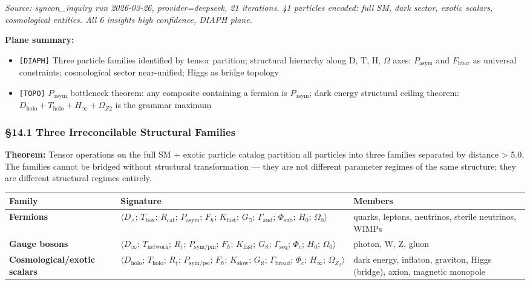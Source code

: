 \documentclass[12pt,a4paper]{article}
\newcommand{\pilcrow}{\S}
\begin{document}
\emph{Source: syncon\_inquiry run 2026-03-26, provider=deepseek, 21 iterations. 41 particles encoded: full SM, dark sector, exotic scalars, cosmological entities. All 6 insights high confidence, DIAPH plane.}

\textbf{Plane summary:}

\begin{itemize}
    \item \texttt{{[}DIAPH{]}} Three particle families identified by tensor partition; structural hierarchy along D, T, H, $\Omega$ axes; $P_{\text{asym}}$ and $F_{\text{hbar}}$ as universal constraints; cosmological sector near-unified; Higgs as bridge topology
    \item \texttt{{[}TOPO{]}} $P_{\text{asym}}$ bottleneck theorem: any composite containing a fermion is $P_{\text{asym}}$; dark energy structural ceiling theorem: $D_{\text{holo}} + T_{\text{holo}} + H_{\infty} + \Omega_{Z2}$ is the grammar maximum
\end{itemize}

\subsubsection{\pilcrow{}14.1 Three Irreconcilable Structural Families}

\textbf{Theorem:} Tensor operations on the full SM + exotic particle catalog partition all particles into three families separated by distance \textgreater{} 5.0. The families cannot be bridged without structural transformation --- they are not different parameter regimes of the same structure; they are different structural regimes entirely.

\begin{table}[htbp]
\centering
\small
{}
\begin{tabularx}{\textwidth}{>{\centering\arraybackslash}X >{\centering\arraybackslash}X >{\centering\arraybackslash}X}
\toprule
\rowcolor{gray!25}\textbf{Family} & \textbf{Signature} & \textbf{Members} \\
\midrule
\rowcolors{1}{white}{gray!10}
\textbf{Fermions} & $\langle D_{\wedge};\, T_{\text{box}};\, R_{\text{cat}};\, P_{\text{asym}};\, F_{\hbar};\, K_{\text{fast}};\, G_{\beth};\, \Gamma_{\text{and}};\, \Phi_{\text{sub}};\, H_0;\, \Omega_0 \rangle$ & quarks, leptons, neutrinos, sterile neutrinos, WIMPs \\
\textbf{Gauge bosons} & $\langle D_{\infty};\, T_{\text{network}};\, R_{\dagger};\, P_{\text{sym/pm}};\, F_{\hbar};\, K_{\text{fast}};\, G_{\aleph};\, \Gamma_{\text{seq}};\, \Phi_c;\, H_0;\, \Omega_0 \rangle$ & photon, W, Z, gluon \\
\textbf{Cosmological/exotic scalars} & $\langle D_{\text{holo}};\, T_{\text{holo}};\, R_{\dagger};\, P_{\text{sym/psi}};\, F_{\hbar};\, K_{\text{slow}};\, G_{\aleph};\, \Gamma_{\text{broad}};\, \Phi_c;\, H_{\infty};\, \Omega_{Z_2} \rangle$ & dark energy, inflaton, graviton, Higgs (bridge), axion, magnetic monopole \\
\bottomrule
\end{tabularx}
\end{table}
\end{document}
